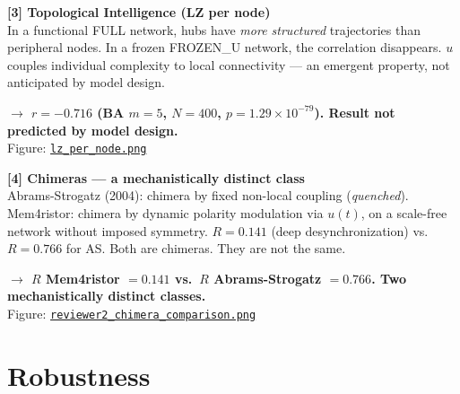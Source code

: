\documentclass[11pt, a4paper]{article}
\newcommand{\result}[1]{\textbf{\color{positive}#1}}
\begin{document}
\vspace{0.5em}

\begin{finding}
\textbf{[3] Topological Intelligence (LZ per node)}\\
In a functional FULL network, hubs have \textit{more structured} trajectories than peripheral nodes.
In a frozen FROZEN\_U network, the correlation disappears. $u$ couples individual complexity to
local connectivity --- an emergent property, not anticipated by model design.

\result{$\rightarrow$ $r = -0.716$ (BA $m=5$, $N=400$, $p = 1.29 \times 10^{-79}$). Result not predicted by model design.}\\
Figure: \href{https://github.com/cafe-virtuel/Mem4ristor/blob/main/figures/lz_per_node.png}{\texttt{lz\_per\_node.png}}
\end{finding}

\vspace{0.5em}

\begin{finding}
\textbf{[4] Chimeras --- a mechanistically distinct class}\\
Abrams-Strogatz (2004): chimera by fixed non-local coupling (\textit{quenched}). Mem4ristor: chimera
by dynamic polarity modulation via $u(t)$, on a scale-free network without imposed symmetry.
$R = 0.141$ (deep desynchronization) vs.\ $R = 0.766$ for AS. Both are chimeras. They are not the
same.

\result{$\rightarrow$ $R$ Mem4ristor $= 0.141$ vs.\ $R$ Abrams-Strogatz $= 0.766$. Two mechanistically distinct classes.}\\
Figure: \href{https://github.com/cafe-virtuel/Mem4ristor/blob/main/figures/reviewer2_chimera_comparison.png}{\texttt{reviewer2\_chimera\_comparison.png}}
\end{finding}

\section{Robustness}
\end{document}
